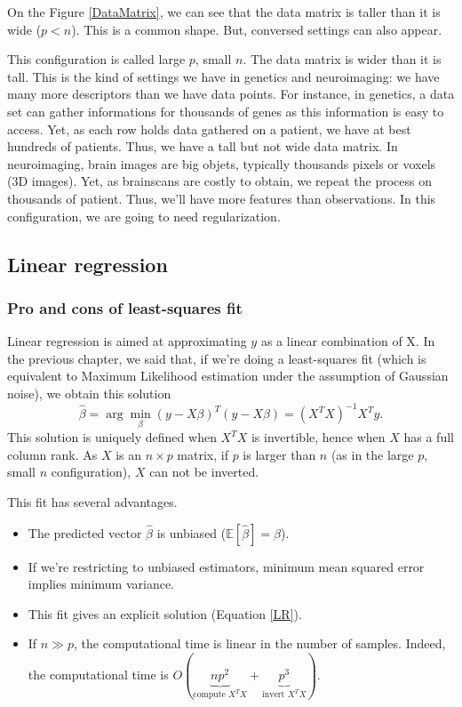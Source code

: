 \documentclass[a4paper,12pt]{article}
\begin{document}
On the Figure \ref{DataMatrix}, we can see that the data matrix is taller than it is wide ($p < n$). This is a  common shape. But, conversed settings can also appear. 

This configuration is called large $p$, small $n$. The data matrix is wider than it is tall. This is the kind of settings we have in genetics and neuroimaging: we have many more descriptors than we have data points. For instance, in genetics, a data set can gather informations for thousands of genes as this information is easy to access. Yet, as each row holds data gathered on a patient, we have at best hundreds of patients. Thus, we have a tall but not wide data matrix. In neuroimaging, brain images are big objets, typically thousands pixels or voxels (3D images). Yet, as brainscans are costly to obtain, we repeat the process on thousands of patient. Thus, we'll have more features than observations. In this configuration, we are going to need regularization.

\subsection{Linear regression}
\subsubsection{Pro and cons of least-squares fit}
Linear regression is aimed at approximating $y$ as a linear combination of X. In the previous chapter, we said that, if we're doing a least-squares fit (which is equivalent to Maximum Likelihood estimation under the assumption of Gaussian noise), we obtain this solution
\begin{equation}
\hat{\beta} = \arg\min_{\beta} (y-X\beta)^{T} (y-X\beta) = (X^T X)^{-1} X^T y.
\label{LR}
\end{equation}
This solution is uniquely defined when $X^T X$ is invertible, hence when $X$ has a full column rank. As $X$ is an $n \times p$ matrix, if $p$ is larger than $n$ (as in the large $p$, small $n$ configuration), $X$ can not be inverted.

This fit has several advantages.
\begin{itemize}
\item The predicted vector $\hat{\beta}$ is unbiased ($\mathbb{E}[\hat{\beta}]= \beta$).
\item If we're restricting to unbiased estimators, minimum mean squared error implies minimum variance.
\item This fit gives an explicit solution (Equation \ref{LR}).
\item If $n \gg p$, the computational time is linear in the number of samples. Indeed, the computational time is $O(\underbrace{np^2}_{\text{compute } X^T X}+\underbrace{p^3}_{\text{invert } X^T X})$. 
\end{itemize}
\end{document}
